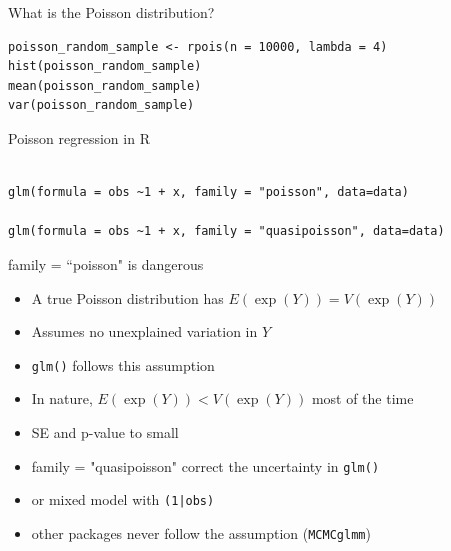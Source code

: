\documentclass[10pt]{beamer}
\makeatletter
\newenvironment{kframe}{%
 \def\at@end@of@kframe{}%
 \ifinner\ifhmode%
  \def\at@end@of@kframe{\end{minipage}}%
  \begin{minipage}{\columnwidth}%
 \fi\fi%
 \def\FrameCommand##1{\hskip\@totalleftmargin \hskip-\fboxsep
 \colorbox{shadecolor}{##1}\hskip-\fboxsep
     \hskip-\linewidth \hskip-\@totalleftmargin \hskip\columnwidth}%
 \MakeFramed {\advance\hsize-\width
   \@totalleftmargin\z@ \linewidth\hsize
   \@setminipage}}%
 {\par\unskip\endMakeFramed%
 \at@end@of@kframe}
\newenvironment{knitrout}{}{} %
\makeatother
\begin{document}
\begin{frame}[fragile]{What is the Poisson distribution?}

    
\begin{knitrout}
\color{fgcolor}\begin{kframe}
\begin{verbatim}
poisson_random_sample <- rpois(n = 10000, lambda = 4)  
hist(poisson_random_sample)
mean(poisson_random_sample)
var(poisson_random_sample)
\end{verbatim}
\end{kframe}
\end{knitrout}

\end{frame}

  
\begin{frame}[fragile]{Poisson regression in R}
    
\begin{knitrout}
\color{fgcolor}\begin{kframe}
\begin{verbatim}

glm(formula = obs ~1 + x, family = "poisson", data=data)

glm(formula = obs ~1 + x, family = "quasipoisson", data=data)
\end{verbatim}
\end{kframe}
\end{knitrout}

\begin{alertblock}{family = ``poisson" is dangerous}
 \begin{itemize}
  \item A true Poisson distribution has $E(\exp(Y))=V(\exp(Y))$
  \item Assumes no unexplained variation in $Y$
  \item \texttt{glm()} follows this assumption
  \item In nature,  $E(\exp(Y)) < V(\exp(Y))$ most of the time
  \item SE and p-value to small
  \item family = "quasipoisson" correct the uncertainty in \texttt{glm()}
  \item or mixed model with \texttt{(1|obs)}
  \item other packages never follow the assumption (\texttt{MCMCglmm})
 \end{itemize}
\end{alertblock}

\end{frame}
\end{document}
